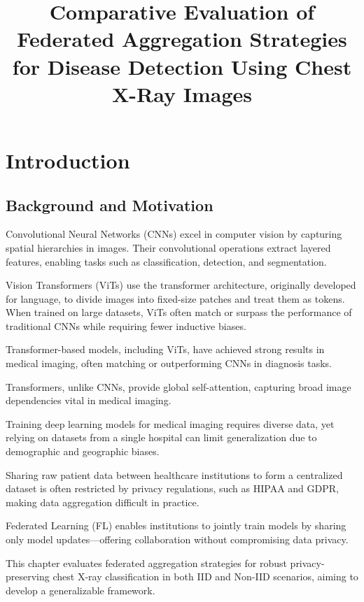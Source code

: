 \documentclass[12pt]{book}
\title{Comparative Evaluation of Federated Aggregation Strategies for Disease Detection Using Chest X-Ray Images}
\date{}
\begin{document}
\maketitle
\tableofcontents

\chapter{Introduction}

\section{Background and Motivation}

Convolutional Neural Networks (CNNs) excel in computer vision by capturing spatial hierarchies in images. Their convolutional operations extract layered features, enabling tasks such as classification, detection, and segmentation.

Vision Transformers (ViTs) use the transformer architecture, originally developed for language, to divide images into fixed-size patches and treat them as tokens. When trained on large datasets, ViTs often match or surpass the performance of traditional CNNs while requiring fewer inductive biases.

Transformer-based models, including ViTs, have achieved strong results in medical imaging, often matching or outperforming CNNs in diagnosis tasks.

Transformers, unlike CNNs, provide global self-attention, capturing broad image dependencies vital in medical imaging.

Training deep learning models for medical imaging requires diverse data, yet relying on datasets from a single hospital can limit generalization due to demographic and geographic biases.

Sharing raw patient data between healthcare institutions to form a centralized dataset is often restricted by privacy regulations, such as HIPAA and GDPR, making data aggregation difficult in practice.

Federated Learning (FL) enables institutions to jointly train models by sharing only model updates—offering collaboration without compromising data privacy.

This chapter evaluates federated aggregation strategies for robust privacy-preserving chest X-ray classification in both IID and Non-IID scenarios, aiming to develop a generalizable framework.
\end{document}
